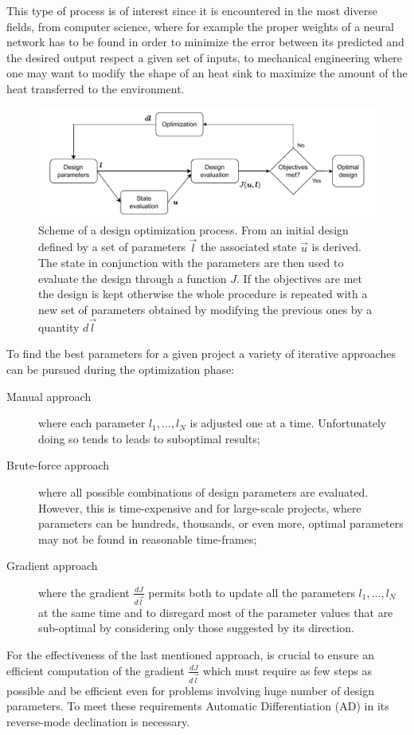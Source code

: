 This type of process is of interest since it is encountered in the most diverse fields, from computer science, where for example the proper weights of a neural network has to be found in order to minimize the error between its predicted and the desired output respect a given set of inputs, to mechanical engineering where one may want to modify the shape of an heat sink to maximize the amount of the heat transferred to the environment.

\begin{figure}
	\centering
	\includegraphics[width=\textwidth]{img/design_opt_scheme.pdf}
	\caption{Scheme of a design optimization process. From an initial design defined by a set of parameters $\vec{l}$ the associated state $\vec{u}$ is derived. The state in conjunction with the parameters are then used to evaluate the design through a function $J$. If the objectives are met the design is kept otherwise the whole procedure is repeated with a new set of parameters obtained by modifying the previous ones by a quantity $d\vec{l}$} 
	\label{fig:design_opt_scheme}
\end{figure}

To find the best parameters for a given project a variety of iterative approaches can be pursued during the optimization phase:
\begin{description}
	\item[Manual approach] where each parameter $l_1, \dots, l_N$ is adjusted one at a time. Unfortunately doing so tends to leads to suboptimal results;
	\item[Brute-force approach] where all possible combinations of design parameters are evaluated. However, this is time-expensive and for large-scale projects, where parameters can be hundreds, thousands, or even more, optimal parameters may not be found in reasonable time-frames;
	\item[Gradient approach] where the gradient $\frac{dJ}{d\vec{l}}$ permits both to update all the parameters $l_1, \dots, l_N$ at the same time and to disregard most of the parameter values that are sub-optimal by considering only those suggested by its direction.
\end{description}
For the effectiveness of the last mentioned approach, is crucial to ensure an efficient computation of the gradient $\frac{dJ}{d\vec{l}}$ which must require as few steps as possible and be efficient even for problems involving huge number of design parameters. To meet these requirements Automatic Differentiation (AD) in its reverse-mode declination is necessary.

